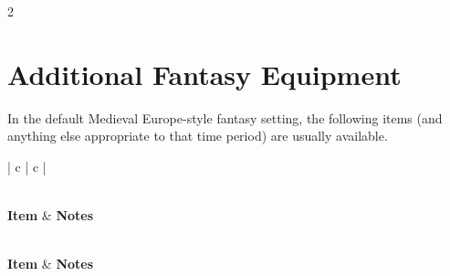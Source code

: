 \begin{multicols}{2}

\chapter{Additional Fantasy Equipment}

In the default Medieval Europe-style fantasy setting, the following items (and anything else appropriate to that time period) are usually available.

\end{multicols}

\begin{longtable}{| c | c |}
\caption{Fantasy Equipment}
\label{tab:Fantasy Equipment} \\
\hline
\textbf{Item} & \textbf{Notes} \\
\hline
\endfirsthead 

\hline
{} \\
\hline
\textbf{Item} & \textbf{Notes} \\
\hline
\endhead

\hline
{} \\
\hline
\endfoot

\hline
\endlastfoot


\end{longtable}
